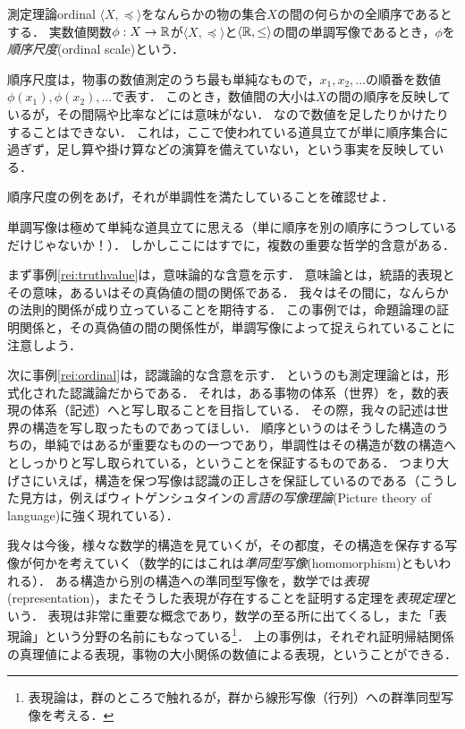 \documentclass[dvipdfmx,11pt,a4paper]{jsarticle}
\begin{document}
\begin{rei}{測定理論}{ordinal}
$\langle X, \preceq \rangle$をなんらかの物の集合$X$の間の何らかの全順序であるとする．
実数値関数$\phi:X \to \mathbb{R}$が$\langle X, \preceq \rangle$と$\langle \mathbb{R}, \leq \rangle$の間の単調写像であるとき，$\phi$を\emph{順序尺度}(ordinal scale)という．

順序尺度は，物事の数値測定のうち最も単純なもので，$x_1, x_2, \dots$の順番を数値$\phi(x_1), \phi(x_2), \dots$で表す．
このとき，数値間の大小は$X$の間の順序を反映しているが，その間隔や比率などには意味がない．
なので数値を足したりかけたりすることはできない．
これは，ここで使われている道具立てが単に順序集合に過ぎず，足し算や掛け算などの演算を備えていない，という事実を反映している．
\end{rei}

\begin{renshu}{}{}
 順序尺度の例をあげ，それが単調性を満たしていることを確認せよ．
\end{renshu}

単調写像は極めて単純な道具立てに思える（単に順序を別の順序にうつしているだけじゃないか！）．
しかしここにはすでに，複数の重要な哲学的含意がある．

まず事例\ref{rei:truthvalue}は，意味論的な含意を示す．
意味論とは，統語的表現とその意味，あるいはその真偽値の間の関係である．
我々はその間に，なんらかの法則的関係が成り立っていることを期待する．
この事例では，命題論理の証明関係と，その真偽値の間の関係性が，単調写像によって捉えられていることに注意しよう．

次に事例\ref{rei:ordinal}は，認識論的な含意を示す．
というのも測定理論とは，形式化された認識論だからである．
それは，ある事物の体系（世界）を，数的表現の体系（記述）へと写し取ることを目指している．
その際，我々の記述は世界の構造を写し取ったものであってほしい．
順序というのはそうした構造のうちの，単純ではあるが重要なものの一つであり，単調性はその構造が数の構造へとしっかりと写し取られている，ということを保証するものである．
つまり大げさにいえば，構造を保つ写像は認識の正しさを保証しているのである（こうした見方は，例えばウィトゲンシュタインの\emph{言語の写像理論}(Picture theory of language)に強く現れている）．

我々は今後，様々な数学的構造を見ていくが，その都度，その構造を保存する写像が何かを考えていく（数学的にはこれは\emph{準同型写像}(homomorphism)ともいわれる）．
ある構造から別の構造への準同型写像を，数学では\emph{表現}(representation)，またそうした表現が存在することを証明する定理を\emph{表現定理}という．
表現は非常に重要な概念であり，数学の至る所に出てくるし，また「表現論」という分野の名前にもなっている\footnote{表現論は，群のところで触れるが，群から線形写像（行列）への群準同型写像を考える．}．
上の事例は，それぞれ証明帰結関係の真理値による表現，事物の大小関係の数値による表現，ということができる．
\end{document}
